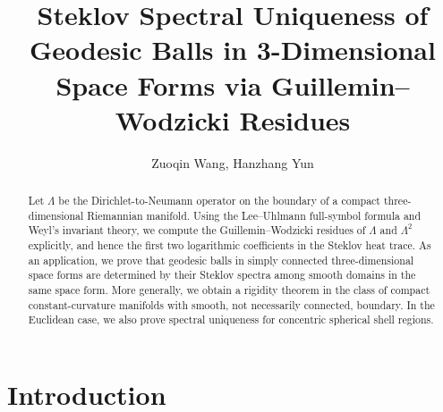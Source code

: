 \documentclass[11pt]{amsart}
\title[Steklov Spectral Uniqueness via Guillemin-Wodzicki Residues]{Steklov Spectral Uniqueness of Geodesic Balls in 3-Dimensional Space Forms via Guillemin--Wodzicki Residues}
\author{Zuoqin Wang, Hanzhang Yun}
\theoremstyle{definition}
\numberwithin{equation}{section}
\begin{document}
	
	
	
	
	\begin{abstract}		
		Let $\Lambda$ be the Dirichlet-to-Neumann operator on the boundary of a compact three-dimensional Riemannian manifold.  Using the Lee--Uhlmann full-symbol formula and Weyl's invariant theory, we compute  the Guillemin--Wodzicki residues of $\Lambda$ and $\Lambda^2$ explicitly, and hence the first two logarithmic coefficients in the Steklov heat trace. As an application, we prove that geodesic balls in simply connected three-dimensional space
		forms are determined by their Steklov spectra among smooth domains in the same space form. More generally, we obtain a rigidity theorem in the class of compact constant-curvature manifolds with smooth, not necessarily connected, boundary.  In the Euclidean case, we also prove spectral uniqueness for concentric spherical shell regions.
	\end{abstract}
	
	
	\maketitle
	
	
	
	
	
	
	\section{Introduction}
	
\end{document}

